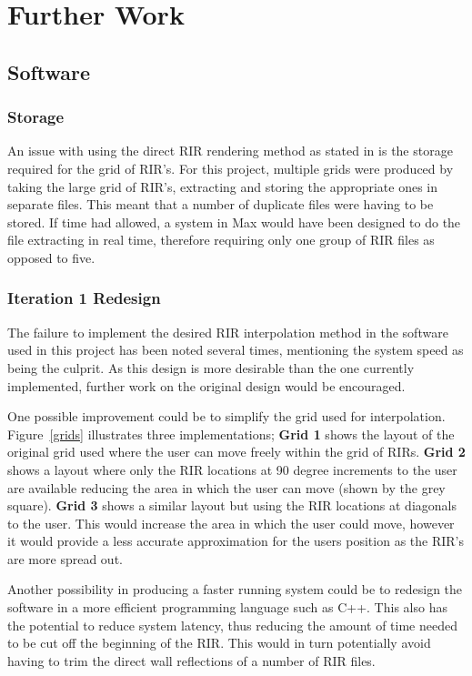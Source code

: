 \documentclass[../../main.tex]{subfiles}
\begin{document}
\section{Further Work}
\label{furtherwork}
	
	\subsection{Software}
		\subsubsection{Storage}
			An issue with using the direct \ac{RIR} rendering method as stated in \cite{Savioja1999} is the storage required for the grid of \ac{RIR}'s. For this project, multiple grids were produced by taking the large grid of \ac{RIR}'s, extracting and storing the appropriate ones in separate files. This meant that a number of duplicate files were having to be stored. If time had allowed, a system in Max would have been designed to do the file extracting in real time, therefore requiring only one group of \ac{RIR} files as opposed to five. 

		\subsubsection{Iteration 1 Redesign}
			The failure to implement the desired \ac{RIR} interpolation method in the software used in this project has been noted several times, mentioning the system speed as being the culprit. As this design is more desirable than the one currently implemented, further work on the original design would be encouraged.

			One possible improvement could be to simplify the grid used for interpolation. Figure~\ref{grids} illustrates three implementations; \textbf{Grid 1} shows the layout of the original grid used where the user can move freely within the grid of RIRs. \textbf{Grid 2} shows a layout where only the \ac{RIR} locations at 90 degree increments to the user are available reducing the area in which the user can move (shown by the grey square). \textbf{Grid 3} shows a similar layout but using the \ac{RIR} locations at diagonals to the user. This would increase the area in which the user could move, however it would provide a less accurate approximation for the users position as the \ac{RIR}'s are more spread out.

			Another possibility in producing a faster running system could be to redesign the software in a more efficient programming language such as C++. This also has the potential to reduce system latency, thus reducing the amount of time needed to be cut off the beginning of the \ac{RIR}. This would in turn potentially avoid having to trim the direct wall reflections of a number of \ac{RIR} files.
\end{document}
